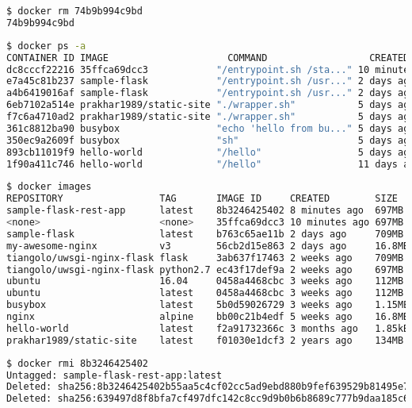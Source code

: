 \begin{lstlisting}[language=bash]
$ docker rm 74b9b994c9bd
74b9b994c9bd
\end{lstlisting}

\begin{rotate}
\begin{lstlisting}[language=bash]
$ docker ps -a
CONTAINER ID IMAGE                     COMMAND                  CREATED             STATUS              PORTS NAMES
dc8cccf22216 35ffca69dcc3            "/entrypoint.sh /sta..." 10 minutes ago Exited (137) 5 minutes ago       romantic_sammet
e7a45c81b237 sample-flask            "/entrypoint.sh /usr..." 2 days ago     Exited (0) 2 days ago            silly_kare
a4b6419016af sample-flask            "/entrypoint.sh /usr..." 2 days ago     Exited (0) 2 days ago            musing_lamport
6eb7102a514e prakhar1989/static-site "./wrapper.sh"           5 days ago     Exited (0) 5 days ago            competent_borg
f7c6a4710ad2 prakhar1989/static-site "./wrapper.sh"           5 days ago     Exited (0) 5 days ago            static-site
361c8812ba90 busybox                 "echo 'hello from bu..." 5 days ago     Exited (0) 5 days ago            blissful_wing
350ec9a2609f busybox                 "sh"                     5 days ago     Exited (0) 5 days ago            nifty_mahavira
893cb11019f9 hello-world             "/hello"                 5 days ago     Exited (0) 5 days ago            competent_spence
1f90a411c746 hello-world             "/hello"                 11 days ago    Exited (0) 11 days ago           reverent_raman

\end{lstlisting}
\end{rotate}

\begin{lstlisting}[language=bash]
$ docker images
REPOSITORY                 TAG       IMAGE ID     CREATED        SIZE
sample-flask-rest-app      latest    8b3246425402 8 minutes ago  697MB
<none>                     <none>    35ffca69dcc3 10 minutes ago 697MB
sample-flask               latest    b763c65ae11b 2 days ago     709MB
my-awesome-nginx           v3        56cb2d15e863 2 days ago     16.8MB
tiangolo/uwsgi-nginx-flask flask     3ab637f17463 2 weeks ago    709MB
tiangolo/uwsgi-nginx-flask python2.7 ec43f17def9a 2 weeks ago    697MB
ubuntu                     16.04     0458a4468cbc 3 weeks ago    112MB
ubuntu                     latest    0458a4468cbc 3 weeks ago    112MB
busybox                    latest    5b0d59026729 3 weeks ago    1.15MB
nginx                      alpine    bb00c21b4edf 5 weeks ago    16.8MB
hello-world                latest    f2a91732366c 3 months ago   1.85kB
prakhar1989/static-site    latest    f01030e1dcf3 2 years ago    134MB
\end{lstlisting}

\begin{lstlisting}[language=bash]
$ docker rmi 8b3246425402
Untagged: sample-flask-rest-app:latest
Deleted: sha256:8b3246425402b55aa5c4cf02cc5ad9ebd880b9fef639529b81495e778e3b3246
Deleted: sha256:639497d8f8bfa7cf497dfc142c8cc9d9b0b6b8689c777b9daa185c618b33d03c
\end{lstlisting}

